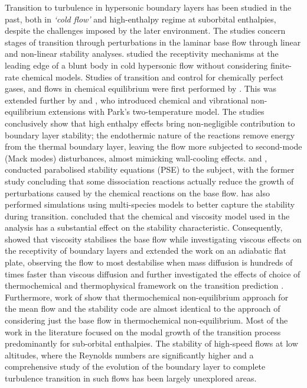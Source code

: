 Transition to turbulence in hypersonic boundary layers has been studied in the past, both in \textit{`cold flow'} and high-enthalpy regime at suborbital enthalpies, despite the challenges imposed by the later environment. The studies concern stages of transition through perturbations in the laminar base flow through linear and non-linear stability analyses. \cite{Cerminara2019, cerminara_sandham_2020} studied the receptivity mechanisms at the leading edge of a blunt body in cold hypersonic flow without considering finite-rate chemical models. Studies of transition and control for chemically perfect gases, and flows in chemical equilibrium were first performed by  \citep{Malik1989, Malik1990b, Malik1990a, Malik1990c}. This was extended further by \cite{Stuckert1994} and \cite{Hudson1997}, who introduced chemical and vibrational non-equilibrium extensions with Park's two-temperature model. The studies conclusively show that high enthalpy effects bring non-negligible contribution to boundary layer stability; the endothermic nature of the reactions remove energy from the thermal boundary layer, leaving the flow more subjected to second-mode (Mack modes) disturbances, almost mimicking wall-cooling effects. \cite{Malik2003} and \cite{Johnson2005}, conducted parabolised stability equations (PSE) to the subject, with the former study concluding that some dissociation reactions actually reduce the growth of perturbations caused by the chemical reactions on the base flow. \cite{Johnson2005} has also performed simulations using multi-species models to better capture the stability during transition. \cite{Franko2010} concluded that the chemical and viscosity model used in the analysis has a substantial effect on the stability characteristic. Consequently, \cite{Klentzman2013} showed that viscosity stabilises the base flow while investigating viscous effects on the receptivity of boundary layers and \cite{miromiro2018} extended the work on an adiabatic flat plate, observing the flow to most destabilise when mass diffusion is hundreds of times faster than viscous diffusion and further investigated the effects of choice of thermochemical and thermophysical framework on the transition prediction \citep{MiroMiro2019}. Furthermore, work of \cite{wartmann2018} show that thermochemical non-equilibrium approach for the mean flow and the stability code are almost identical to the approach of considering just the base flow in thermochemical non-equilibrium. Most of the work in the literature focused on the modal growth of the transition process predominantly for sub-orbital enthalpies. The stability of high-speed flows at low altitudes, where the Reynolds numbers are significantly higher and a comprehensive study of the evolution of the boundary layer to complete turbulence transition in such flows has been largely unexplored areas.  

